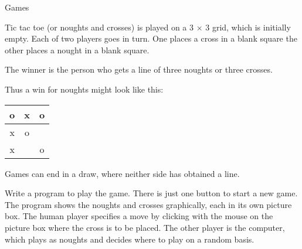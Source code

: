 		Games
		\begin{EXE}
			\item	{} Tic tac toe (or noughts and crosses) is played on a 3 × 3 grid, which is initially empty. Each of two players goes in turn. One places a cross in a blank square the other places a nought in a blank square.
				
		 		The winner is the person who gets a line of three noughts or three crosses. 
			
				Thus a win for noughts might look like this:
				\begin{center}
					\begin{tabular}{c|c|c}
						o & x & o \\ \hline
						x & o & \\ \hline
						x &  	& o 
					\end{tabular}
				\end{center}

				Games can end in a draw, where neither side has obtained a line.
				
				Write a program to play the game. There is just one button to start a new game. The program shows the noughts and crosses graphically, each in its own picture box. The human player specifies a move by clicking with the mouse on the picture box where the cross is to be placed. The other player is the computer, which plays as noughts and decides where to play on a random basis.
		\end{EXE}

